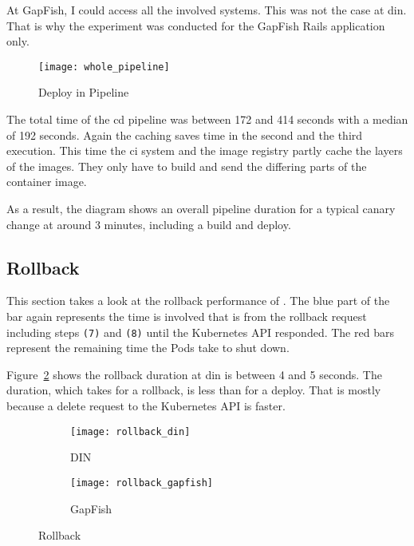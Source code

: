 At GapFish, I could access all the involved systems. This was not the case at \gls{din}. That is
why the experiment was conducted for the GapFish Rails application only.

\begin{figure}[htbp]
  \centering
  \texttt{[image: whole\_pipeline]}
  \caption{Deploy in Pipeline}
  \label{fig:whole pipeline}
\end{figure}

The total time of the \gls{cd} pipeline was between 172 and 414 seconds with a median of
192 seconds. Again the caching saves time in the second and the third execution. This time
the \gls{ci} system and the image registry partly cache the layers of the images. They
only have to build and send the differing parts of the container image.

As a result, the diagram shows an overall pipeline duration for a typical canary change at around
3 minutes, including a build and deploy.

\subsection{Rollback}

This section takes a look at the rollback performance of \deployer{}. The blue part
of the bar again represents the time \deployer{} is involved that is from the rollback
request including steps \texttt{(7)} and \texttt{(8)} until the Kubernetes API responded. The red bars
represent the remaining time the Pods take to shut down.

Figure~\ref{fig:rollback_din} shows the rollback duration at \gls{din}
is between 4 and 5 seconds. The duration, which \deployer{} takes for a rollback, is less than for a deploy.
That is mostly because a delete request to the Kubernetes API is faster.

\begin{figure}[htbp]
  \centering
  \begin{subfigure}{.5\textwidth}
    \texttt{[image: rollback\_din]}
    \caption{DIN}
    \label{fig:rollback_din}
  \end{subfigure}%
  \begin{subfigure}{.5\textwidth}
    \texttt{[image: rollback\_gapfish]}
    \caption{GapFish}
    \label{fig:rollback_gapfish}
  \end{subfigure}
  \caption{Rollback}
\end{figure}

